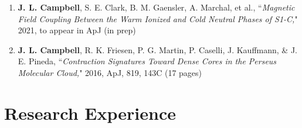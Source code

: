 \documentclass[10pt]{res} %
\begin{document}
\begin{resume}
\begin{enumerate}
\itemsep-1em 
	\item \textbf{J. L. Campbell}, S. E. Clark, B. M. Gaensler, A. Marchal, et al., ``\textit{Magnetic Field Coupling Between the Warm Ionized and Cold Neutral Phases of S1-C,}" 2021, to appear in ApJ (in prep) \\
	\item \textbf{J. L. Campbell}, R. K. Friesen, P. G. Martin, P. Caselli, J. Kauffmann, \& J. E. Pineda, ``\textit{Contraction Signatures Toward Dense Cores in the Perseus Molecular Cloud,}" 2016, ApJ, 819, 143C (17 pages)
\end{enumerate}
\newpage
\section{\Large Research Experience}
\vspace{-5pt} %
\noindent\makebox[\linewidth]{\rule{\textwidth}{0.4pt}}
\vspace{-20pt} %


\end{resume}
\end{document}
